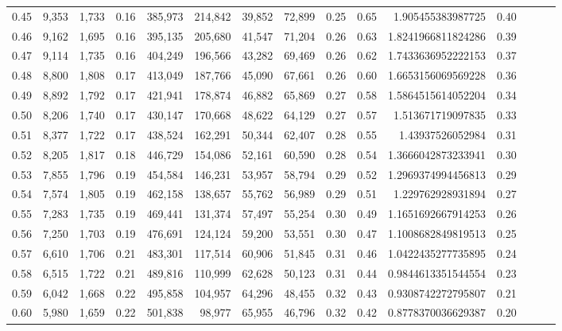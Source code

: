 \begin{tabular}{rrrrrrrrrrrrrrr}
0.45 &   9,353 &  1,733 &  0.16 &  385,973 &  214,842 &   39,852 &   72,899 &  0.25 &  0.65 &     1.905455383987725 &      0.40 \\
0.46 &   9,162 &  1,695 &  0.16 &  395,135 &  205,680 &   41,547 &   71,204 &  0.26 &  0.63 &    1.8241966811824286 &      0.39 \\
0.47 &   9,114 &  1,735 &  0.16 &  404,249 &  196,566 &   43,282 &   69,469 &  0.26 &  0.62 &    1.7433636952222153 &      0.37 \\
0.48 &   8,800 &  1,808 &  0.17 &  413,049 &  187,766 &   45,090 &   67,661 &  0.26 &  0.60 &    1.6653156069569228 &      0.36 \\
0.49 &   8,892 &  1,792 &  0.17 &  421,941 &  178,874 &   46,882 &   65,869 &  0.27 &  0.58 &    1.5864515614052204 &      0.34 \\
0.50 &   8,206 &  1,740 &  0.17 &  430,147 &  170,668 &   48,622 &   64,129 &  0.27 &  0.57 &     1.513671719097835 &      0.33 \\
0.51 &   8,377 &  1,722 &  0.17 &  438,524 &  162,291 &   50,344 &   62,407 &  0.28 &  0.55 &      1.43937526052984 &      0.31 \\
0.52 &   8,205 &  1,817 &  0.18 &  446,729 &  154,086 &   52,161 &   60,590 &  0.28 &  0.54 &    1.3666042873233941 &      0.30 \\
0.53 &   7,855 &  1,796 &  0.19 &  454,584 &  146,231 &   53,957 &   58,794 &  0.29 &  0.52 &    1.2969374994456813 &      0.29 \\
0.54 &   7,574 &  1,805 &  0.19 &  462,158 &  138,657 &   55,762 &   56,989 &  0.29 &  0.51 &     1.229762928931894 &      0.27 \\
0.55 &   7,283 &  1,735 &  0.19 &  469,441 &  131,374 &   57,497 &   55,254 &  0.30 &  0.49 &    1.1651692667914253 &      0.26 \\
0.56 &   7,250 &  1,703 &  0.19 &  476,691 &  124,124 &   59,200 &   53,551 &  0.30 &  0.47 &    1.1008682849819513 &      0.25 \\
0.57 &   6,610 &  1,706 &  0.21 &  483,301 &  117,514 &   60,906 &   51,845 &  0.31 &  0.46 &    1.0422435277735895 &      0.24 \\
0.58 &   6,515 &  1,722 &  0.21 &  489,816 &  110,999 &   62,628 &   50,123 &  0.31 &  0.44 &    0.9844613351544554 &      0.23 \\
0.59 &   6,042 &  1,668 &  0.22 &  495,858 &  104,957 &   64,296 &   48,455 &  0.32 &  0.43 &    0.9308742272795807 &      0.21 \\
0.60 &   5,980 &  1,659 &  0.22 &  501,838 &   98,977 &   65,955 &   46,796 &  0.32 &  0.42 &    0.8778370036629387 &      0.20 \\

\end{tabular}
